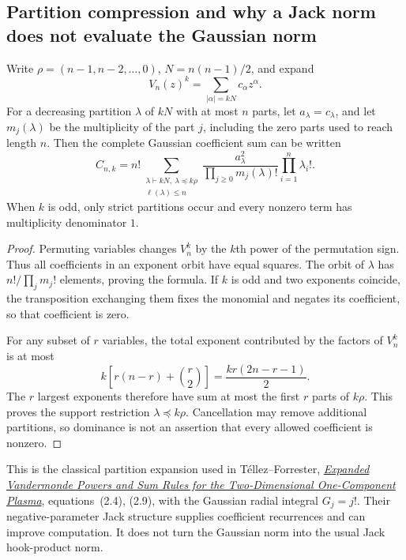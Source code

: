 \documentclass[11pt]{article}
\theoremstyle{remark}
\numberwithin{equation}{section}
\begin{document}
\subsection{Partition compression and why a Jack norm does not evaluate the Gaussian norm}
\label{subsec:uniform-partition-compression}
Write $\rho=(n-1,n-2,\ldots,0)$, $N=n(n-1)/2$, and expand
\[
 V_n(z)^k=\sum_{|\alpha|=kN}c_\alpha z^\alpha.
\]
For a decreasing partition $\lambda$ of $kN$ with at most $n$ parts,
let $a_\lambda=c_\lambda$, and let $m_j(\lambda)$ be the multiplicity
of the part $j$, including the zero parts used to reach length $n$.
Then the complete Gaussian coefficient sum can be written
\begin{equation}\label{eq:uniform-partition-norm}
 C_{n,k}=n!\sum_{\substack{\lambda\vdash kN,\ \lambda\preceq k\rho\\
                    \ell(\lambda)\le n}}
 \frac{a_\lambda^2}{\prod_{j\ge0}m_j(\lambda)!}
 \prod_{i=1}^n\lambda_i!.
\end{equation}
When $k$ is odd, only strict partitions occur and every nonzero term
has multiplicity denominator $1$.
\begin{proof}
Permuting variables changes $V_n^k$ by the $k$th power of the
permutation sign. Thus all coefficients in an exponent orbit have equal
squares. The orbit of $\lambda$ has $n!/\prod_jm_j!$ elements,
proving the formula. If $k$ is odd and two exponents coincide, the
transposition exchanging them fixes the monomial and negates its
coefficient, so that coefficient is zero.

For any subset of $r$ variables, the total exponent contributed by
the factors of $V_n^k$ is at most
\[
 k\left[r(n-r)+\binom r2\right]
 =\frac{kr(2n-r-1)}2.
\]
The $r$ largest exponents therefore have sum at most the first $r$
parts of $k\rho$. This proves the support restriction
$\lambda\preceq k\rho$. Cancellation may remove additional
partitions, so dominance is not an assertion that every allowed
coefficient is nonzero.
\end{proof}

This is the classical partition expansion used in T\'ellez--Forrester,
\href{https://arxiv.org/pdf/1204.6003}{\emph{Expanded Vandermonde Powers
and Sum Rules for the Two-Dimensional One-Component Plasma}},
equations~(2.4), (2.9), with the Gaussian radial integral
$G_j=j!$. Their negative-parameter Jack structure supplies coefficient
recurrences and can improve computation. It does not turn the Gaussian
norm into the usual Jack hook-product norm.
\end{document}
